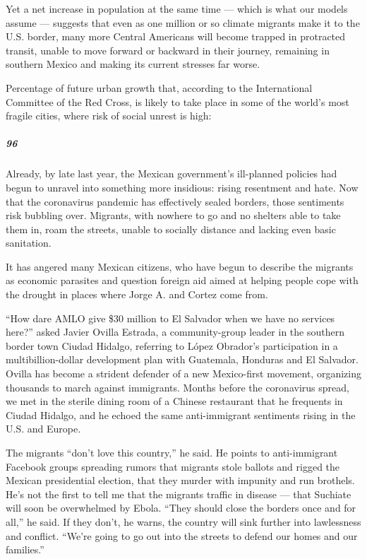 Yet a net increase in population at the same time --- which is what our
models assume --- suggests that even as one million or so climate
migrants make it to the U.S. border, many more Central Americans will
become trapped in protracted transit, unable to move forward or backward
in their journey, remaining in southern Mexico and making its current
stresses far worse.

Percentage of future urban growth that, according to the International
Committee of the Red Cross, is likely to take place in some of the
world's most fragile cities, where risk of social unrest is high:

\hypertarget{96}{%
\subparagraph{96}\label{96}}

Already, by late last year, the Mexican government's ill-planned
policies had begun to unravel into something more insidious: rising
resentment and hate. Now that the coronavirus pandemic has effectively
sealed borders, those sentiments risk bubbling over. Migrants, with
nowhere to go and no shelters able to take them in, roam the streets,
unable to socially distance and lacking even basic sanitation.

It has angered many Mexican citizens, who have begun to describe the
migrants as economic parasites and question foreign aid aimed at helping
people cope with the drought in places where Jorge A. and Cortez come
from.

``How dare AMLO give \$30 million to El Salvador when we have no
services here?'' asked Javier Ovilla Estrada, a community-group leader
in the southern border town Ciudad Hidalgo, referring to López Obrador's
participation in a multibillion-dollar development plan with Guatemala,
Honduras and El Salvador. Ovilla has become a strident defender of a new
Mexico-first movement, organizing thousands to march against immigrants.
Months before the coronavirus spread, we met in the sterile dining room
of a Chinese restaurant that he frequents in Ciudad Hidalgo, and he
echoed the same anti-immigrant sentiments rising in the U.S. and Europe.

The migrants ``don't love this country,'' he said. He points to
anti-immigrant Facebook groups spreading rumors that migrants stole
ballots and rigged the Mexican presidential election, that they murder
with impunity and run brothels. He's not the first to tell me that the
migrants traffic in disease --- that Suchiate will soon be overwhelmed
by Ebola. ``They should close the borders once and for all,'' he said.
If they don't, he warns, the country will sink further into lawlessness
and conflict. ``We're going to go out into the streets to defend our
homes and our families.''

